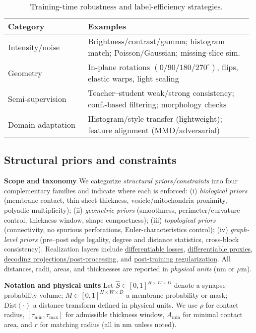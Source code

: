 \begin{table}[t]
  \centering
  \scriptsize
  \setlength{\tabcolsep}{2pt}\renewcommand{\arraystretch}{1.05}
  \begin{tabular}{@{} p{0.32\linewidth} p{0.66\linewidth} @{}}
    \hline
    \textbf{Category} & \textbf{Examples} \\
    \hline
    Intensity/noise & Brightness/contrast/gamma; histogram match; Poisson/Gaussian; missing-slice sim. \\
    Geometry & In-plane rotations \((0/90/180/270^\circ)\), flips, elastic warps, light scaling \\
    Semi-supervision & Teacher--student weak/strong consistency; conf.-based filtering; morphology checks \\
    Domain adaptation & Histogram/style transfer (lightweight); feature alignment (MMD/adversarial) \\
    \hline
  \end{tabular}
  \caption{Training-time robustness and label-efficiency strategies.}
  \label{tab:dl-aug-compare}
\end{table}

\subsection{Structural priors and constraints}

\noindent\textbf{Scope and taxonomy}\;
We categorize \emph{structural priors/constraints} into four complementary families and indicate where each is enforced:
(i) \emph{biological priors} (membrane contact, thin-sheet thickness, vesicle/mitochondria proximity, polyadic multiplicity);
(ii) \emph{geometric priors} (smoothness, perimeter/curvature control, thickness window, shape compactness);
(iii) \emph{topological priors} (connectivity, no spurious perforations, Euler-characteristics control);
(iv) \emph{graph-level priors} (pre--post edge legality, degree and distance statistics, cross-block consistency).
Realization layers include \underline{differentiable losses}, \underline{differentiable proxies}, \underline{decoding projections/post-processing}, and \underline{post-training regularization}. All distances, radii, areas, and thicknesses are reported in \emph{physical units} (nm or \(\mu\)m).\par

\medskip
\noindent\textbf{Notation and physical units}\;
Let \(\hat S\in[0,1]^{H\times W\times D}\) denote a synapse-probability volume; \(M\in[0,1]^{H\times W\times D}\) a membrane probability or mask; \(\mathrm{Dist}(\cdot)\) a distance transform defined in physical units.
We use \(\rho\) for contact radius, \([\tau_{\min},\tau_{\max}]\) for admissible thickness window, \(A_{\min}\) for minimal contact area, and \(r\) for matching radius (all in nm unless noted).\par

